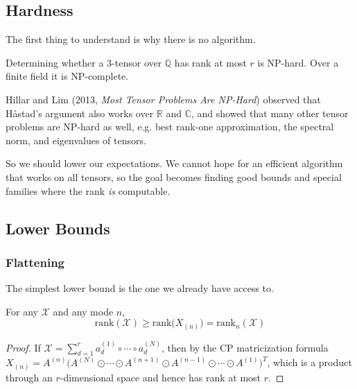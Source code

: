 \subsection{Hardness}

  The first thing to understand is why there is no algorithm.

  \begin{theorem}[H{\aa}stad, 1990]
    Determining whether a $3$-tensor over $\mathbb{Q}$ has rank at most $r$ is NP-hard. Over a finite field it is NP-complete.
  \end{theorem}

  Hillar and Lim (2013, \textit{Most Tensor Problems Are NP-Hard}) observed that H{\aa}stad's argument also works over $\mathbb{R}$ and $\mathbb{C}$, and showed that many other tensor problems are NP-hard as well, e.g. best rank-one approximation, the spectral norm, and eigenvalues of tensors.

  So we should lower our expectations. We cannot hope for an efficient algorithm that works on all tensors, so the goal becomes finding good bounds and special families where the rank \textit{is} computable.

\subsection{Lower Bounds}

  \subsubsection{Flattening}

    The simplest lower bound is the one we already have access to.

    \begin{lemma}
      \label{lem:flattening}
      For any $\mathcal{X}$ and any mode $n$, 
      \begin{equation}
        \mathrm{rank}(\mathcal{X}) \geq \mathrm{rank}\big(\hyperref[def:mode-n-matricization]{X_{(n)}}\big) = \hyperref[def:n-rank]{\mathrm{rank}_n}(\mathcal{X})
      \end{equation}
    \end{lemma}
    \begin{proof}
      If $\mathcal{X} = \sum_{d=1}^r a_d^{(1)} \circ \cdots \circ a_d^{(N)}$, then by the CP matricization formula $X_{(n)} = A^{(n)} \big( A^{(N)} \odot \cdots \odot A^{(n+1)} \odot A^{(n-1)} \odot \cdots \odot A^{(1)} \big)^T$, which is a product through an $r$-dimensional space and hence has rank at most $r$.
    \end{proof}

